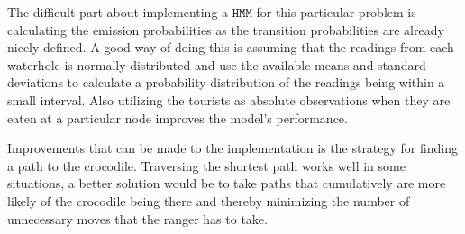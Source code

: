 \documentclass[12pt, a4paper]{article}
\newcommand{\HMM}[0]{%
  \mathtt{HMM}
}
\begin{document}


The difficult part about implementing a $\HMM$ for this particular problem is calculating the emission probabilities as the transition probabilities are already nicely defined. A good way of doing this is assuming that the readings from each waterhole is normally distributed and use the available means and standard deviations to calculate a probability distribution of the readings being within a small interval. Also utilizing the tourists as absolute observations when they are eaten at a particular node improves the model's performance.

Improvements that can be made to the implementation is the strategy for finding a path to the crocodile. Traversing the shortest path works well in some situations, a better solution would be to take paths that cumulatively are more likely of the crocodile being there and thereby minimizing the number of unnecessary moves that the ranger has to take.

\raggedright
{}

\end{document}
